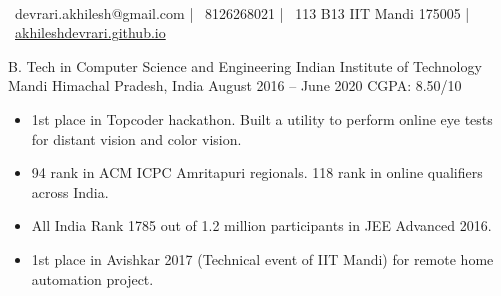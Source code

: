 \documentclass[]{awesome-cv}
\begin{document}
    
\begin{center}
	  \\
	\vspace{2mm}
	{\faEnvelope\ devrari.akhilesh@gmail.com} | {\faMobile\ 8126268021} | {\faMapMarker\ 113 B13 IIT Mandi 175005} | {\faLink\ \href{https://akhileshdevrari.github.io/}{akhileshdevrari.github.io}}
\end{center}

\vspace{1mm}
\begin{cventries}
	\cventry
	{B. Tech in Computer Science and Engineering}
	{Indian Institute of Technology Mandi}
	{Himachal Pradesh, India}
	{August 2016 – June 2020}
	{CGPA: 8.50/10}
\end{cventries}



\begin{itemize}
	\item 1st place in Topcoder hackathon. Built a utility to perform online eye tests for distant vision and color vision.
	\item 94 rank  in ACM ICPC Amritapuri regionals. 118 rank in online qualifiers across India.
	\item All India Rank 1785  out of 1.2 million participants in JEE Advanced 2016.
	\item 1st place in Avishkar 2017 (Technical event of IIT Mandi) for remote home automation project.
\end{itemize}
\end{document}
